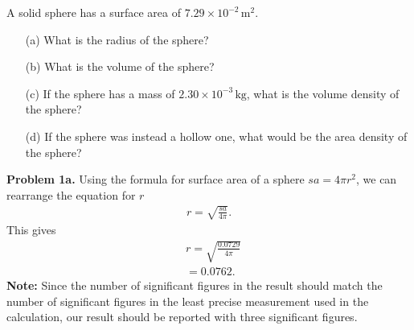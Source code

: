 \documentclass{report}
\begin{document}
    \pagebreak 
    \bigbreak \noindent 
    \begin{exm}
        A solid sphere has a surface area of $7.29 \times 10^{-2} \, \text{m}^2$.
        \begin{enumerate}
            \item[(a)] What is the radius of the sphere? 
            \item[(b)] What is the volume of the sphere? 
            \item[(c)] If the sphere has a mass of $2.30 \times 10^{-3} \, \text{kg}$, what is the volume density of the sphere? 
            \item[(d)] If the sphere was instead a hollow one, what would be the area density of the sphere? 
        \end{enumerate}
    \end{exm}
    \bigbreak \noindent 
    \textbf{Problem 1a.} Using the formula for surface area of a sphere $sa = 4\pi r^{2} $, we can rearrange the equation for $r$
    \begin{align*}
        r = \sqrt{\frac{sa}{4\pi}}
    .\end{align*}
    This gives 
    \begin{align*}
         &r = \sqrt{\frac{0.0729}{4\pi}} \\
         &=0.0762
    .\end{align*}
    \bigbreak \noindent 
    \textbf{Note:} Since the number of significant figures in the result should match the number of significant figures in the least precise measurement used in the calculation, our result should be reported with three significant figures.


    \pagebreak 

    \pagebreak 

    \pagebreak 
\end{document}
